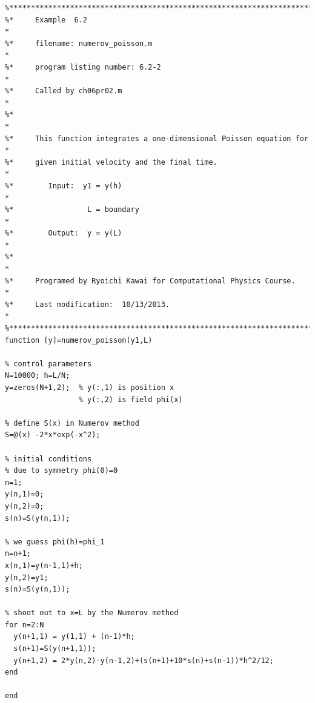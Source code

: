 \bigskip
\begin{verbatim}
%**************************************************************************
%*     Example  6.2                                                       *
%*     filename: numerov_poisson.m                                        *
%*     program listing number: 6.2-2                                      *
%*     Called by ch06pr02.m                                               *
%*                                                                        *
%*     This function integrates a one-dimensional Poisson equation for    *
%*     given initial velocity and the final time.                         *
%*        Input:  y1 = y(h)                                               *
%*                 L = boundary                                           *
%*        Output:  y = y(L)                                               *
%*                                                                        *
%*     Programed by Ryoichi Kawai for Computational Physics Course.       *
%*     Last modification:  10/13/2013.                                    *
%**************************************************************************
function [y]=numerov_poisson(y1,L)

% control parameters
N=10000; h=L/N;
y=zeros(N+1,2);  % y(:,1) is position x
                 % y(:,2) is field phi(x)

% define S(x) in Numerov method
S=@(x) -2*x*exp(-x^2);

% initial conditions
% due to symmetry phi(0)=0
n=1;
y(n,1)=0;
y(n,2)=0;
s(n)=S(y(n,1));

% we guess phi(h)=phi_1
n=n+1;
x(n,1)=y(n-1,1)+h;
y(n,2)=y1;
s(n)=S(y(n,1));

% shoot out to x=L by the Numerov method
for n=2:N
  y(n+1,1) = y(1,1) + (n-1)*h;
  s(n+1)=S(y(n+1,1));
  y(n+1,2) = 2*y(n,2)-y(n-1,2)+(s(n+1)+10*s(n)+s(n-1))*h^2/12;
end

end
\end{verbatim}

\normalsize

\bigskip
\noindent
\program
\label{prog:qm_free_fall}

